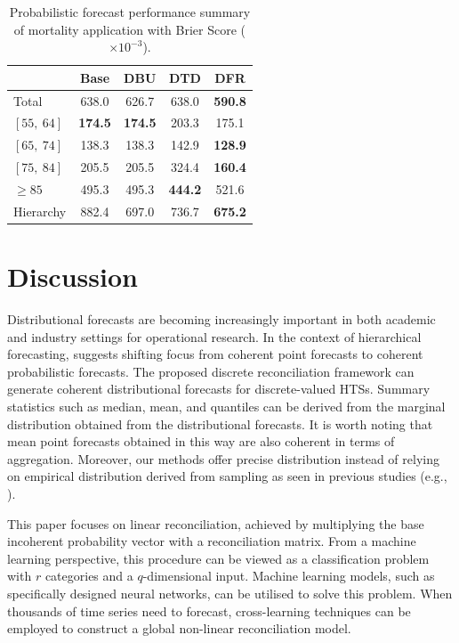 \documentclass[a4paper,review,12pt,authoryear]{elsarticle}
\begin{document}
     \begin{table}
       \centering
       \caption{\label{tab:mortality_age} Probabilistic forecast performance summary of mortality application with Brier Score ($\times 10^{-3}$).}
       \begin{tabular}{lcccc}
       \toprule
       & Base & DBU & DTD & DFR \\\midrule
       Total & 638.0 & 626.7 & 638.0 & \textbf{590.8} \\
       $[55, ~ 64]$ & \textbf{174.5} & \textbf{174.5} & 203.3 & 175.1 \\
       $[65, ~ 74]$ & 138.3 & 138.3 & 142.9 & \textbf{128.9}\\
       $[75, ~ 84]$ & 205.5 & 205.5 & 324.4 & \textbf{160.4}\\
       $\ge 85$ & 495.3 & 495.3 & \textbf{444.2} & 521.6\\
       Hierarchy & 882.4 & 697.0 & 736.7 & \textbf{675.2} \\
       \bottomrule
      \end{tabular}
     \end{table}

     \section{Discussion}



     Distributional forecasts are becoming increasingly important in both academic and industry settings for operational research. In the context of hierarchical forecasting, \cite{kolassaWeWantCoherent2022} suggests shifting focus from coherent point forecasts to coherent probabilistic forecasts.
     The proposed discrete reconciliation framework can generate coherent distributional forecasts for discrete-valued HTSs.
     Summary statistics such as median, mean, and quantiles can be derived from the marginal distribution obtained from the distributional forecasts.
     It is worth noting that mean point forecasts obtained in this way are also coherent in terms of aggregation.
     Moreover, our methods offer precise distribution instead of relying on empirical distribution derived from sampling as seen in previous studies (e.g., \citealp{jeonProbabilisticForecastReconciliation2019,coraniProbabilisticReconciliationCount2022}).

     This paper focuses on linear reconciliation, achieved by multiplying the base incoherent probability vector with a reconciliation matrix.
     From a machine learning perspective, this procedure can be viewed as a classification problem with $r$ categories and a $q$-dimensional input. Machine learning models, such as specifically designed neural networks, can be utilised to solve this problem.
     When thousands of time series need to forecast, cross-learning techniques can be employed to construct a global non-linear reconciliation model.
\end{document}
